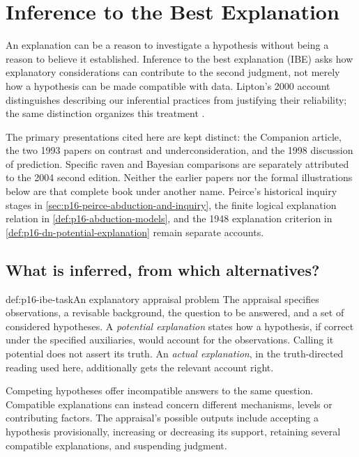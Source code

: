 \chapter{Inference to the Best Explanation}
\label{sec:p16-inference-to-best-explanation}

An explanation can be a reason to investigate a hypothesis without being
a reason to believe it established. Inference to the best explanation
(IBE) asks how explanatory considerations can contribute to the second
judgment, not merely how a hypothesis can be made compatible with data.
Lipton's 2000 account distinguishes describing our inferential practices
from justifying their reliability; the same distinction organizes this
treatment \cite[author copy pp.~1--4]{Lipton2000IBECompanion}.

The primary presentations cited here are kept distinct: the Companion
article, the two 1993 papers on contrast and underconsideration, and the
1998 discussion of prediction. Specific raven and Bayesian comparisons
are separately attributed to the 2004 second edition. Neither the earlier
papers nor the formal illustrations below are that complete book under
another name. Peirce's historical inquiry stages in
\cref{sec:p16-peirce-abduction-and-inquiry}, the finite logical explanation
relation in \cref{def:p16-abduction-models}, and the 1948 explanation
criterion in \cref{def:p16-dn-potential-explanation} remain separate accounts.

\section{What is inferred, from which alternatives?}
\label{sec:p16-ibe-inferential-task}

\begin{hbdefinition}{def:p16-ibe-task}{An explanatory appraisal problem}
The appraisal specifies observations, a revisable background, the question
to be answered, and a set of considered hypotheses. A \emph{potential
explanation} states how a hypothesis, if correct under the specified
auxiliaries, would account for the observations. Calling it potential does
not assert its truth. An \emph{actual explanation}, in the truth-directed
reading used here, additionally gets the relevant account right.

Competing hypotheses offer incompatible answers to the same question.
Compatible explanations can instead concern different mechanisms, levels
or contributing factors. The appraisal's possible outputs include accepting
a hypothesis provisionally, increasing or decreasing its support,
retaining several compatible explanations, and suspending judgment.
\end{hbdefinition}

